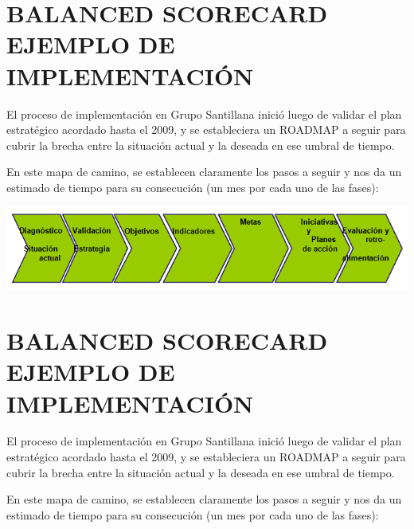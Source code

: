 \section{BALANCED SCORECARD EJEMPLO DE IMPLEMENTACIÓN}
\item {El proceso de implementación en Grupo Santillana inició luego de validar  el plan estratégico acordado hasta el 2009, y se estableciera un ROADMAP a seguir para cubrir la brecha entre la situación actual y la deseada en ese umbral de tiempo.

En este mapa de camino, se establecen claramente los pasos a seguir y nos da un estimado de tiempo para su consecución (un mes por cada uno de las fases):}

\begin{center}
\includegraphics[width=15cm]{./Imagenes/ImagenEmpresa2.png}
\end{center}

\section{BALANCED SCORECARD EJEMPLO DE IMPLEMENTACIÓN}
\item {El proceso de implementación en Grupo Santillana inició luego de validar  el plan estratégico acordado hasta el 2009, y se estableciera un ROADMAP a seguir para cubrir la brecha entre la situación actual y la deseada en ese umbral de tiempo.

En este mapa de camino, se establecen claramente los pasos a seguir y nos da un estimado de tiempo para su consecución (un mes por cada uno de las fases):}

